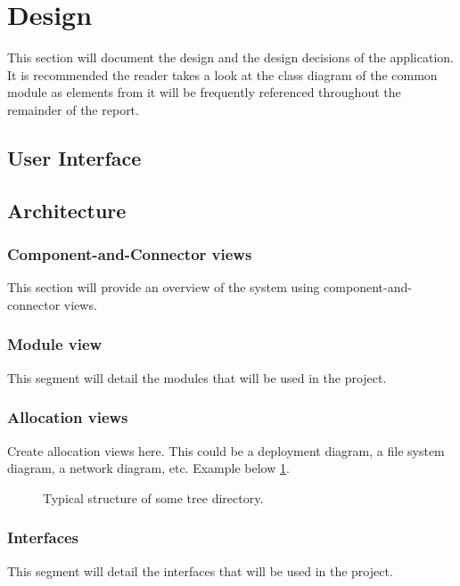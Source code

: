 \section{Design}
This section will document the design and the design decisions of the application. 
It is recommended the reader takes a look at the class diagram of the common module as elements
from it will be frequently referenced throughout the remainder of the report.

\subsection{User Interface}

\subsection{Architecture}

\subsubsection{Component-and-Connector views}
This section will provide an overview of the system using component-and-connector views. \\

\subsubsection{Module view}
This segment will detail the modules that will be used in the project. \\


\subsubsection{Allocation views}
Create allocation views here. This could be a deployment diagram, a file system diagram, a network diagram, etc.
Example below  \ref{fig:moduleStructure}. \\
\begin{figure}[H]
    \caption{Typical structure of some tree directory.}
    \label{fig:moduleStructure}
\end{figure}


\subsubsection{Interfaces}
This segment will detail the interfaces that will be used in the project.














